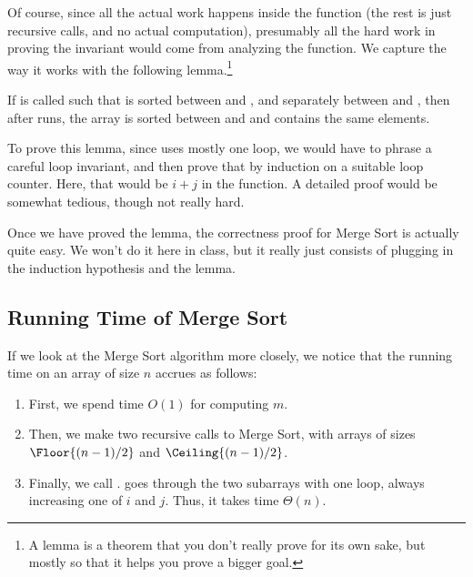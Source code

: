 Of course, since all the actual work happens inside the 
function (the rest is just recursive calls, and no actual
computation), presumably all the hard work in proving the
invariant would come from analyzing the  function.
We capture the way it works with the following lemma.\footnote{A lemma
  is a theorem that you don't really prove for its own sake, but
  mostly so that it helps you prove a bigger goal.}

\begin{lemma}
If  is called such that  is sorted between
 and , and separately between  and ,
then after  runs, the array is sorted between  and
 and contains the same elements. 
\end{lemma}

To prove this lemma, since  uses mostly one loop, we would
have to phrase a careful loop invariant, and then prove that by
induction on a suitable loop counter. 
Here, that would be $i+j$ in the  function. A detailed
proof would be somewhat tedious, though not really hard.

Once we have proved the lemma, the correctness proof for
Merge Sort is actually quite easy. We won't do it here in class,
but it really just consists of plugging in the induction hypothesis and
the lemma.

\subsection{Running Time of Merge Sort}
If we look at the Merge Sort algorithm more closely,
we notice that the running time on an array of size $n$ accrues as
follows:
\begin{enumerate}
\item First, we spend time $O(1)$ for computing $m$. 
\item Then, we make two recursive calls to Merge Sort, with arrays of 
sizes $\Floor{(n-1)/2}$ and $\Ceiling{(n-1)/2}$.
\item Finally, we call .  goes through the two
  subarrays with one loop, always increasing one of $i$ and $j$. 
  Thus, it takes time $\Theta(n)$.
\end{enumerate}

